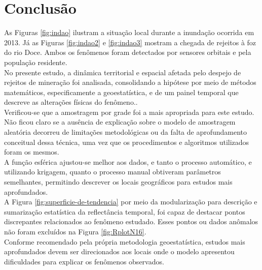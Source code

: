 \section{Conclusão}

\hspace*{1.25 cm}  As Figuras \ref{fig:indao} ilustram a situação local durante a inundação ocorrida em 2013. Já as Figuras \ref{fig:indao2} e \ref{fig:indao3} mostram a chegada de rejeitos à foz do rio Doce. Ambos os fenômenos foram detectados por sensores orbitais e pela população residente.\\
%
\hspace*{1.25 cm} No presente estudo, a dinâmica territorial e espacial afetada pelo despejo de rejeitos de mineração foi analisada, consolidando a hipótese por meio de métodos matemáticos, especificamente a geoestatística, e de um painel temporal que descreve as alterações físicas do fenômeno..\\
% 
\hspace*{1.25 cm} Verificou-se que a amostragem por grade foi a mais apropriada para este estudo. Não ficou claro se a ausência de explicação sobre o modelo de amostragem aleatória decorreu de limitações metodológicas ou da falta de aprofundamento conceitual dessa técnica, uma vez que os procedimentos e algoritmos utilizados foram os mesmos.\\
%
\hspace*{1.25 cm}A função esférica ajustou-se melhor aos dados, e tanto o processo automático, e utilizando krigagem, quanto o processo manual obtiveram parâmetros semelhantes, permitindo descrever os locais geográficos para estudos mais aprofundados. \\
%
\hspace*{1.25 cm} A  Figura \ref{fig:superficie-de-tendencia} por meio da modularização para descrição e sumarização estatística da reflectância temporal, foi capaz de destacar pontos discrepantes relacionados ao fenômeno estudado. Esses pontos ou dados anômalos não foram excluídos na Figura \ref{fig:RplotN16}.\\
%
\hspace*{1.25 cm} Conforme recomendado pela própria metodologia geoestatística, estudos mais aprofundados devem ser direcionados aos locais onde o modelo apresentou dificuldades para explicar os fenômenos observados.
